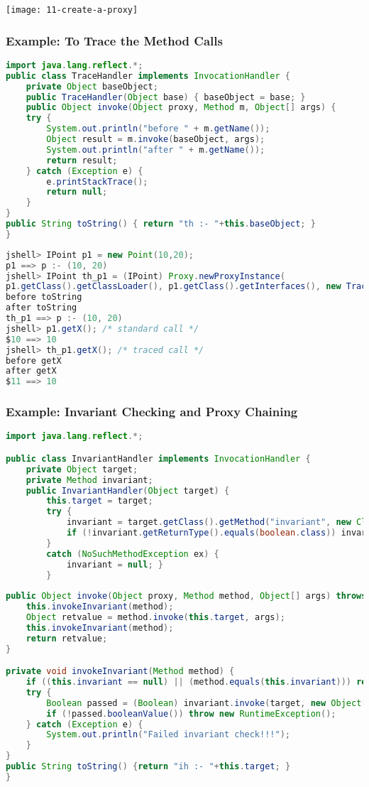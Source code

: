 \begin{center}
\texttt{[image: 11-create-a-proxy]}
\end{center}

\subsubsection{Example: To Trace the Method Calls}

\begin{lstlisting}[language=Java]
import java.lang.reflect.*;
public class TraceHandler implements InvocationHandler {
	private Object baseObject;
	public TraceHandler(Object base) { baseObject = base; }
	public Object invoke(Object proxy, Method m, Object[] args) {
	try {
		System.out.println("before " + m.getName());
		Object result = m.invoke(baseObject, args);
		System.out.println("after " + m.getName());
		return result;
	} catch (Exception e) {
		e.printStackTrace(); 
		return null;
	}
}
public String toString() { return "th :- "+this.baseObject; }
}
\end{lstlisting}

\begin{lstlisting}[language=Java]
jshell> IPoint p1 = new Point(10,20);
p1 ==> p :- (10, 20)
jshell> IPoint th_p1 = (IPoint) Proxy.newProxyInstance(
p1.getClass().getClassLoader(), p1.getClass().getInterfaces(), new TraceHandler(p1));
before toString
after toString
th_p1 ==> p :- (10, 20)
jshell> p1.getX(); /* standard call */
$10 ==> 10
jshell> th_p1.getX(); /* traced call */
before getX
after getX
$11 ==> 10
\end{lstlisting}

\subsubsection{Example: Invariant Checking and Proxy Chaining}

\begin{lstlisting}[language=Java]
import java.lang.reflect.*;

public class InvariantHandler implements InvocationHandler {
	private Object target;
	private Method invariant;
	public InvariantHandler(Object target) {
		this.target = target;
		try {
			invariant = target.getClass().getMethod("invariant", new Class<?>[]{});
			if (!invariant.getReturnType().equals(boolean.class)) invariant = null;
		} 
		catch (NoSuchMethodException ex) { 
			invariant = null; }
		}
		
public Object invoke(Object proxy, Method method, Object[] args) throws Throwable {
	this.invokeInvariant(method);
	Object retvalue = method.invoke(this.target, args);
	this.invokeInvariant(method);
	return retvalue;
}

private void invokeInvariant(Method method) {
	if ((this.invariant == null) || (method.equals(this.invariant))) return;
	try {
		Boolean passed = (Boolean) invariant.invoke(target, new Object[]{});
		if (!passed.booleanValue()) throw new RuntimeException();
	} catch (Exception e) {
		System.out.println("Failed invariant check!!!"); 
	}
}
public String toString() {return "ih :- "+this.target; }
}
\end{lstlisting}

